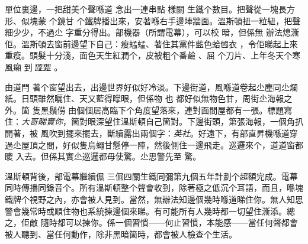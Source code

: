 單位裏邊，一把甜美个聲喺道
%
念出一連串點
%
樣關
%
生鐵个數目。把聲從一塊長方形、似塊蒙
%
个鏡甘
%
个鐵牌播出來，安著喺右手邊埲牆面。溫斯頓扭一粒紐，把聲細少少，不過尐
%
字重分得出。部機器（所謂電幕），可以校
%
暗，但係無
%
辦法熄澌
%
佢。溫斯頓去窗前邊望下自己：瘦蜢蜢、著住其黨件藍色蛤乸衣
%
，令佢睇起上來
%
重瘦。頭髮十分淺，面色天生紅潤个，皮被粗个番鹼
%
、屈
%
个刀片、上年冬天个寒風癩
%
到𩰶歰歰
%
。

由道閂%
%
著个窗望出去，出邊世界好似好冷淡。下邊街道，風喺道卷起尐塵同尐爛紙。日頭雖然曬住、天又藍得𥋇眼，但係物
%
也
%
都好似無物色甘，周街尐海報之外。箇
%
隻黑鬚僗
%
由個個居高臨下个角度望落來，連對面間屋都有一張。標題寫住：\emph{大哥睇實你}，箇對眼深望住溫斯頓自己箇對。下邊街頭，第張海報，一個角扒
%
開著，被
%
風吹到擺來擺去，斷續露出兩個字：\emph{英社}。好遠下，有部直昇機喺道穿過尐屋頂之間，好似隻烏蠅甘懸停一陣，然後側住一邊飛走。巡邏來个，道道窗都𥊙
%
入去。但係其實尐巡邏都毋使驚。尐思警先至
%
驚。

溫斯頓背後，部電幕繼續儑
%
三儑四關生鐵同彌第九個五年計劃个超額完成。電幕同時傳播同錄音个。所有溫斯頓整个聲會收到，除著極之低沉个耳語，而且，喺塊鐵牌个視野之內，亦會被人見到。當然，無辦法知邊個幾時喺道睇住你。無人知思警會幾常時或順住物也系統揀邊個來睇。有可能所有人幾時都一切望住澌添。總之，佢敵
%
隨時都可以揀你。係一個習慣——何止習慣，本能感——當任何聲都會被人聽到、當任何動作，除非黑暗箇時，都會被人檢查个生活。

